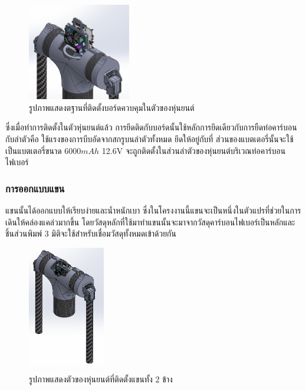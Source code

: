 \begin{figure}[!ht]
  \centering
  \includegraphics[width=0.4\textwidth]{chapter4/images/install_board.PNG}
  \caption{รูปภาพแสดงตฐานที่ติดตั้งบอร์ดควบคุมในตัวของหุ่นยนต์}
  \label{fig:install_board}
\end{figure}

ซึ่งเมื่อทำการติดตั้งในตัวหุ่นยนต์แล้ว การยึดติดกับบอร์ดนั้นใช้หลักการยึดเดียวกับการยืดท่อคาร์บอนกับลำตัวคือ
ใช้แรงของการบีบอัดจากสกรูบนลำตัวทั้งหมด ยึดให้อยู่กับที่ ส่วนของแบตเตอรี่นั้นจะใช้เป็นแบตเตอรี่ขนาด 6000$mAh$ 12.6V
จะถูกติดตั้งในส่วนลำตัวของหุ่นยนต์บริเวณท่อคาร์บอนไฟเบอร์
\clearpage
\subsubsection{การออกแบบแขน}
แขนนั้นได้ออกแบบให้เรียบง่ายและน้ำหนักเบา ซึ่งในโครงงานนี้แขนจะเป็นหนึ่งในตัวแปรที่ช่วยในการเดินให้คล่องแคล่วมากขึ้น
โดยวัสดุหลักที่ใช้มาทำแขนนั้นจะมาจากวัสดุคาร์บอนไฟเบอร์เป็นหลักและชิ้นส่วนพิมพ์ 3 มิติจะใช้สำหรับเชื่อมวัสดุทั้งหมดเข้าด้วยกัน
\begin{figure}[h!]
  \centering
  \includegraphics[width=0.3\textwidth]{chapter4/images/troso.PNG}
  \caption{รูปภาพแสดงตัวของหุ่นยนต์ที่ติดตั้งแขนทั้ง 2 ข้าง}
  \label{fig:troso}
\end{figure}

